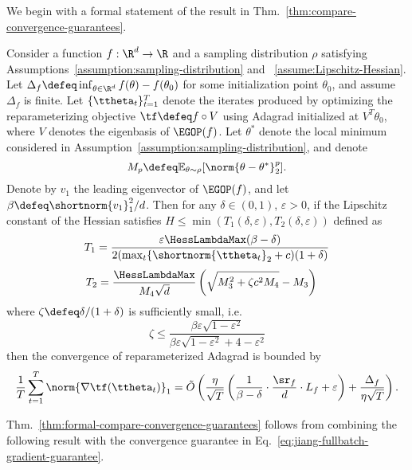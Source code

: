 We begin with a formal statement of the result in Thm.~\ref{thm:compare-convergence-guarantees}.
\begin{theorem}\label{thm:formal-compare-convergence-guarantees}
    Consider a function $f:\R^d\rightarrow \R$ and a sampling distribution $\rho$ satisfying Assumptions~\ref{assumption:sampling-distribution} and ~\ref{assume:Lipschitz-Hessian}. Let $\Delta_f \defeq \inf_{\theta\in \R^d} f(\theta) -f(\theta_0)$ for some initialization point $\theta_0$, and assume $\Delta_f$ is finite. Let $\{\ttheta_t\}_{t=1}^T$ denote the iterates produced by optimizing the reparameterizing objective $\tf \defeq f\circ V$ using Adagrad initialized at $V^T \theta_0$, where $V$ denotes the eigenbasis of $\EGOP(f)$. Let $\theta^*$ denote the local minimum considered in Assumption~\ref{assumption:sampling-distribution}, and denote
   \[
    M_p \defeq \mathbb{E}_{\theta\sim\rho}[\norm{\theta-\theta^*}^{p}_2].
   \]
   Denote by $v_1$ the leading eigenvector of $\EGOP(f)$, and let $\beta \defeq \shortnorm{v_1}^2_1/d$. Then for any $\delta \in (0, 1)$, $\varepsilon > 0$, if the Lipschitz constant of the Hessian satisfies $H\leq \min(T_1(\delta, \varepsilon), T_2(\delta, \varepsilon))$ defined as
    \[
        T_1 = \frac{\varepsilon\HessLambdaMax (\beta-\delta)}{2(\max_{t}\{\shortnorm{\ttheta_t}_2+c)(1+\delta)}
    \]
    \begin{align*}
        T_2 &= \frac{\HessLambdaMax}{M_4 \sqrt{d}}\left(\sqrt{M_3^2 + \zeta c^2 M_4} -  M_3\right)
    \end{align*}
    where $\zeta \defeq \delta/(1+\delta)$ is sufficiently small, i.e.
    \[
        \zeta \leq \frac{\beta \varepsilon\sqrt{1-\varepsilon^2}}{\beta \varepsilon\sqrt{1-\varepsilon^2} + 4-\varepsilon^2}
    \]
    then the convergence of reparameterized Adagrad is bounded by
    \[
        \frac{1}{T} \sum_{t=1}^T \norm{\nabla \tf(\ttheta_t)}_1 = \tilde{O}\left(\frac{\eta }{\sqrt{T}}\left(\frac{1}{\beta-\delta}\cdot \frac{\sr_f }{d}\cdot L_f + \varepsilon\right) + \frac{\Delta_f}{\eta\sqrt{T}}\right).
    \]
\end{theorem}

Thm.~\ref{thm:formal-compare-convergence-guarantees} follows from combining the following result with the convergence guarantee in Eq.~\ref{eq:jiang-fullbatch-gradient-guarantee}.

